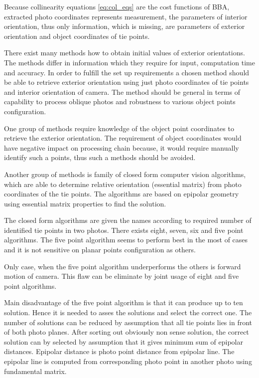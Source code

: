 \documentclass[a4paper,12pt]{article}
\begin{document}
Because collinearity equations \eqref{eq:col_eqs} are the cost functions of BBA,
extracted photo coordinates represents measurement,
the parameters of interior orientation, thus only information, 
which is missing, are parameters of exterior orientation and object coordinates of 
tie points. 


There exist many methods how to obtain initial values of exterior orientations. The methods 
differ in information which they require for input, computation time and accuracy. 
In order to fulfill the set up requirements a chosen method should be able to retrieve exterior orientation 
using just photo coordinates of tie points and interior orientation of camera. The method 
should be general in terms of capability to process oblique photos and robustness to 
various object points configuration.

One group of methods require knowledge of the object point coordinates to retrieve the exterior
orientation. 
The requirement of object coordinates would have negative impact on processing 
chain because, it would require manually identify such a points, thus 
such a methods should be avoided. 


Another group of methods is family of closed form computer vision algorithms,
which are able to determine relative orientation (essential matrix) from photo coordinates 
of the tie points. The algorithms are based on epipolar geometry using essential matrix 
properties to find the solution. 


The closed form algorithms are given the names 
according to required number of identified tie points in two photos.
There exists eight, seven, six and five point algorithms. The five point algorithm seems to perform best in the most
of cases \cite{stewenius2006recent} and it is not sensitive on planar points configuration as others.

Only case, when the five point algorithm \cite{nister2004efficient} underperforms 
\cite{bruckner2008experimental} the others is forward motion of camera.
This flaw can be eliminate by  joint usage of eight and five point algorithms.

Main disadvantage of the five point algorithm is that it can produce up to ten solution.
Hence it is needed to asses the solutions and select the correct one. The number of solutions
can be reduced by assumption that all tie points lies in front of both photo 
planes. After sorting out obviously non sense solution,
 the correct solution can by selected by assumption that it gives minimum sum of epipolar distances.
 Epipolar distance is photo point distance
 from epipolar line. The epipolar line is computed from corresponding photo point 
 in another photo using fundamental matrix.
  
\end{document}
